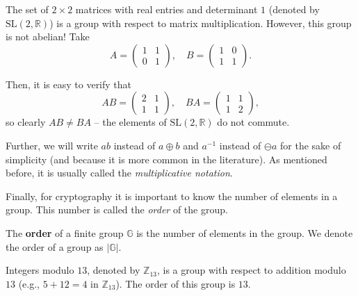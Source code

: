 \documentclass[../lecture-notes.tex]{subfiles}
\begin{document}
\begin{example}
    The set of $2 \times 2$ matrices with real entries and determinant $1$ (denoted by $\text{SL}(2,\mathbb{R})$) is a group with respect to matrix multiplication. However, this group is not abelian! Take
    \begin{equation}
        A = \begin{pmatrix}
            1 & 1 \\
            0 & 1
        \end{pmatrix}, \quad B = \begin{pmatrix}
            1 & 0 \\
            1 & 1
        \end{pmatrix}.
    \end{equation}

    Then, it is easy to verify that
    \begin{equation}
        AB = \begin{pmatrix}
            2 & 1 \\
            1 & 1
        \end{pmatrix}, \quad BA = \begin{pmatrix}
            1 & 1 \\
            1 & 2
        \end{pmatrix},
    \end{equation}
    so clearly $AB \neq BA$ -- the elements of $\text{SL}(2, \mathbb{R})$ do not commute.
\end{example}

\begin{remark}
    Further, we will write $ab$ instead of $a \oplus b$ and $a^{-1}$ instead of $\ominus a$ for the sake of simplicity (and because it is more common in the literature). As mentioned before, it is usually called the \textit{multiplicative notation}.
\end{remark}

Finally, for cryptography it is important to know the number of elements in a group. This number is called the \textit{order} of the group.
\begin{definition}
    The \textbf{order} of a finite group $\mathbb{G}$ is the number of elements in the group. We denote the order of a group as $|\mathbb{G}|$.
\end{definition}
\begin{example}
    Integers modulo $13$, denoted by $\mathbb{Z}_{13}$, is a group with respect to addition modulo $13$ (e.g., $5+12=4$ in $\mathbb{Z}_{13}$). The order of this group is $13$.
\end{example}
\end{document}
